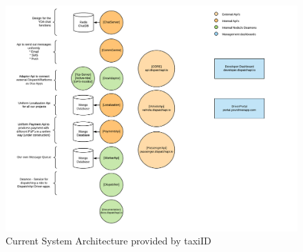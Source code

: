 
\begin{figure}[!htb]
	\centering
	\includegraphics[width=1\textwidth]{Architecture}
	\caption[Current System Architecture]{Current System Architecture provided by taxiID}
	\label{fig:Architecture}
\end{figure}


